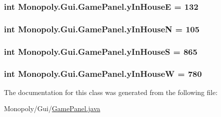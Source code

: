 \subsubsection[{\texorpdfstring{y\+In\+HouseE}{yInHouseE}}]{\setlength{\rightskip}{0pt plus 5cm}int Monopoly.\+Gui.\+Game\+Panel.\+y\+In\+HouseE = 132\hspace{0.3cm}{\ttfamily [private]}}\hypertarget{class_monopoly_1_1_gui_1_1_game_panel_ad76ff974efddae3ae381969386ea9fab}{}\label{class_monopoly_1_1_gui_1_1_game_panel_ad76ff974efddae3ae381969386ea9fab}
\subsubsection[{\texorpdfstring{y\+In\+HouseN}{yInHouseN}}]{\setlength{\rightskip}{0pt plus 5cm}int Monopoly.\+Gui.\+Game\+Panel.\+y\+In\+HouseN = 105\hspace{0.3cm}{\ttfamily [private]}}\hypertarget{class_monopoly_1_1_gui_1_1_game_panel_ae43dfa7b6bbe50bfcf6aedae15300948}{}\label{class_monopoly_1_1_gui_1_1_game_panel_ae43dfa7b6bbe50bfcf6aedae15300948}
\subsubsection[{\texorpdfstring{y\+In\+HouseS}{yInHouseS}}]{\setlength{\rightskip}{0pt plus 5cm}int Monopoly.\+Gui.\+Game\+Panel.\+y\+In\+HouseS = 865\hspace{0.3cm}{\ttfamily [private]}}\hypertarget{class_monopoly_1_1_gui_1_1_game_panel_aba9060000ece3843dcdb7c7760aa931c}{}\label{class_monopoly_1_1_gui_1_1_game_panel_aba9060000ece3843dcdb7c7760aa931c}
\subsubsection[{\texorpdfstring{y\+In\+HouseW}{yInHouseW}}]{\setlength{\rightskip}{0pt plus 5cm}int Monopoly.\+Gui.\+Game\+Panel.\+y\+In\+HouseW = 780\hspace{0.3cm}{\ttfamily [private]}}\hypertarget{class_monopoly_1_1_gui_1_1_game_panel_a13b869ff6b15a120ea34a3d49265cd03}{}\label{class_monopoly_1_1_gui_1_1_game_panel_a13b869ff6b15a120ea34a3d49265cd03}


The documentation for this class was generated from the following file\+:\begin{DoxyCompactItemize}
\item 
Monopoly/\+Gui/\hyperlink{_game_panel_8java}{Game\+Panel.\+java}\end{DoxyCompactItemize}
